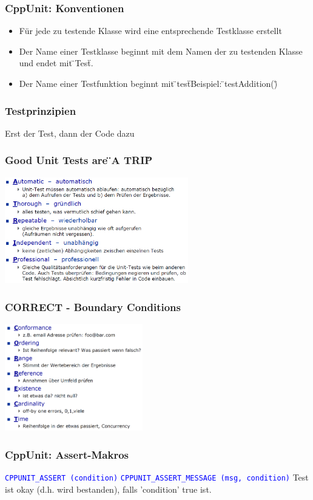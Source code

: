 \begin{multicols}{2}
\subsubsection{CppUnit: Konventionen}
\begin{itemize}
	\item Für jede zu testende Klasse wird eine entsprechende Testklasse erstellt
	\item Der Name einer Testklasse beginnt mit dem Namen der zu testenden Klasse und endet mit \"{}Test\"{}.
	\item Der Name einer Testfunktion beginnt mit \"{}test\"{}\newline Beispiel: \"{}testAddition()\"{}
\end{itemize} 
\subsubsection{Testprinzipien}
Erst der Test, dann der Code dazu
\subsubsection{Good Unit Tests are \"{}A TRIP\"{}}
\hspace{0.5cm}
\includegraphics[width=8cm]{images/atrip}
\subsubsection{CORRECT - Boundary Conditions}
\hspace{0.5cm}
\includegraphics[width=6cm]{images/correct}
\subsubsection{CppUnit: Assert-Makros}
\begin{minipage}{10cm}
    \begin{itemize}
    \footnotesize{
    	\item \textcolor{blue}{\texttt{CPPUNIT\_ASSERT (condition)}}\newline 
    	\textcolor{blue}{\texttt{CPPUNIT\_ASSERT\_MESSAGE (msg, condition)}} \newline 
    	Test ist okay (d.h. wird bestanden), falls 'condition' true ist.
        
}
\end{itemize}
\end{minipage}
\end{multicols}
